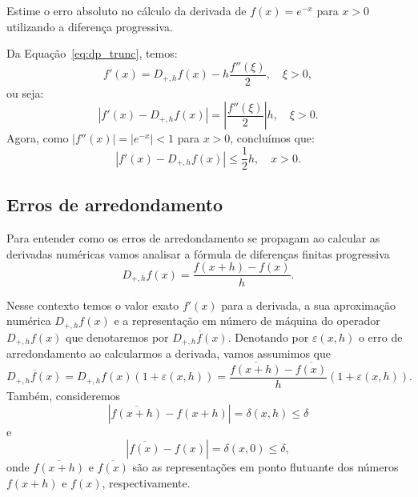 \begin{ex}
Estime o erro absoluto no cálculo da derivada de $f(x)=e^{-x}$ para $x>0$ utilizando a diferença progressiva.
\end{ex}
\begin{sol}
Da Equação~\ref{eq:dp_trunc}, temos:
\begin{equation*}
  f'(x) = D_{+,h}f(x) - h\frac{f''(\xi)}{2},\quad \xi>0,
\end{equation*}
ou seja:
\begin{equation*}
  |f'(x) - D_{+,h}f(x)| = \left|\frac{f''(\xi)}{2}\right|h,\quad \xi>0.
\end{equation*}
Agora, como $|f''(x)| = |e^{-x}| < 1$ para $x>0$, concluímos que:
\begin{equation*}
  |f'(x) - D_{+,h}f(x)| \leq \frac{1}{2}h,\quad x>0.
\end{equation*}
\end{sol}

\subsection{Erros de arredondamento}
Para entender como os erros de arredondamento se propagam ao calcular as derivadas numéricas vamos analisar a fórmula de diferenças finitas progressiva
\begin{equation*}
  D_{+,h}f(x) =\frac{f(x+h)-f(x)}{h}.  
\end{equation*}

Nesse contexto temos o valor exato $f'(x)$ para a derivada, a sua aproximação numérica $D_{+,h}f(x)$ e a representação em número de máquina do operador $D_{+,h}f(x)$ que denotaremos por $\overline{D_{+,h}f(x)}$. Denotando por $\varepsilon(x,h)$ o erro de arredondamento ao calcularmos a derivada, vamos assumimos que
\begin{equation}\label{ex:ea_dp}
\overline{D_{+,h}f(x)}=D_{+,h}f(x)(1+\varepsilon(x,h))=\frac{\overline{f(x+h)}-\overline{f(x)}}{h}(1+\varepsilon(x,h)).  
\end{equation}
Também, consideremos
\begin{equation*}
|\overline{f(x+h)}-f(x+h)|=\delta(x,h)\leq \delta  
\end{equation*}
e
\begin{equation*}
  |\overline{f(x)}-f(x)|=\delta(x,0)\leq \delta,  
\end{equation*}
onde $\overline{f(x+h)}$ e $\overline{f(x)}$ são as representações em ponto flutuante dos números $f(x+h)$ e $f(x)$, respectivamente. 

